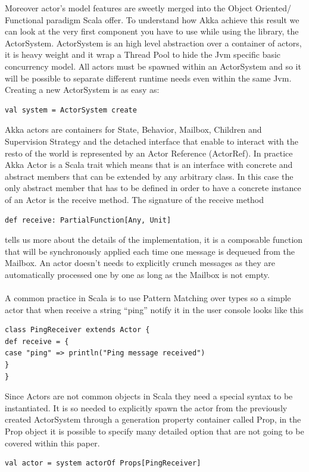 \documentclass{sig-alternate}
\begin{document}
Moreover actor's model features are sweetly merged into the Object Oriented/ Functional paradigm Scala offer.
To understand how Akka achieve this result we can look at the very first component you have to use while using the library, the ActorSystem.
ActorSystem is an high level abstraction over a container of actors, it is heavy weight and it wrap a Thread Pool to hide the Jvm specific basic concurrency model.
All actors must be spawned within an ActorSystem and so it will be possible to separate different runtime needs even within the same Jvm.
Creating a new ActorSystem is as easy as:
\begin{lstlisting}
val system = ActorSystem create
\end{lstlisting}

Akka actors are containers for State, Behavior, Mailbox, Children and Supervision Strategy and the detached interface that enable to interact with the resto of the world is represented by an Actor Reference (ActorRef).
In practice Akka Actor is a Scala trait which means that is an interface with concrete and abstract members that can be extended by any arbitrary class.
In this case the only abstract member that has to be defined in order to have a concrete instance of an Actor is the receive method.
The signature of the receive method 
\begin{lstlisting}
def receive: PartialFunction[Any, Unit]
\end{lstlisting}
tells us more about the details of the implementation, it is a composable function that will be synchronously applied each time one message is dequeued from the Mailbox.
An actor doesn't needs to explicitly crunch messages as they are automatically processed one by one as long as the Mailbox is not empty.
\\\\

A common practice in Scala is to use Pattern Matching over types so a simple actor that when receive a string ``ping'' notify it in the user console looks like this
\begin{lstlisting}
class PingReceiver extends Actor {
def receive = {
case "ping" => println("Ping message received")
}
}
\end{lstlisting}

Since Actors are not common objects in Scala they need a special syntax to be instantiated.
It is so needed to explicitly spawn the actor from the previously created ActorSystem through a generation property container called Prop, in the Prop object it is possible to specify many detailed option that are not going to be covered within this paper.
\begin{lstlisting}
val actor = system actorOf Props[PingReceiver]
\end{lstlisting}
\end{document}
